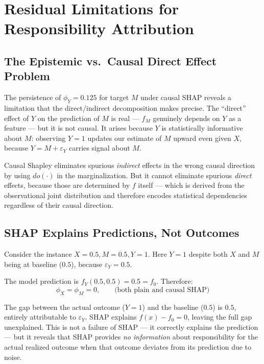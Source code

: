 \documentclass[12pt]{article}
\begin{document}
\section{Residual Limitations for Responsibility Attribution}

\subsection{The Epistemic vs.\ Causal Direct Effect Problem}

The persistence of $\phi_Y = 0.125$ for target $M$ under causal SHAP reveals a limitation
that the direct/indirect decomposition makes precise. The ``direct'' effect of $Y$ on the
prediction of $M$ is real --- $f_M$ genuinely depends on $Y$ as a feature --- but it is
not causal. It arises because $Y$ is statistically informative about $M$: observing $Y=1$
updates our estimate of $M$ upward even given $X$, because $Y = M + \varepsilon_Y$ carries
signal about $M$.

Causal Shapley eliminates spurious \emph{indirect} effects in the wrong causal direction
by using $do(\cdot)$ in the marginalization. But it cannot eliminate spurious \emph{direct}
effects, because those are determined by $f$ itself --- which is derived from the observational
joint distribution and therefore encodes statistical dependencies regardless of their
causal direction.

\subsection{SHAP Explains Predictions, Not Outcomes}

Consider the instance $X = 0.5, M = 0.5, Y = 1$. Here $Y = 1$ despite both $X$ and $M$
being at baseline ($0.5$), because $\varepsilon_Y = 0.5$.

The model prediction is $f_Y(0.5, 0.5) = 0.5 = f_0$. Therefore:
\begin{equation}
\phi_X = \phi_M = 0, \qquad \text{(both plain and causal SHAP)}
\end{equation}

The gap between the actual outcome ($Y=1$) and the baseline ($0.5$) is $0.5$, entirely
attributable to $\varepsilon_Y$. SHAP explains $f(x) - f_0 = 0$, leaving the full gap
unexplained. This is not a failure of SHAP --- it correctly explains the prediction ---
but it reveals that SHAP provides \emph{no information} about responsibility for the
actual realized outcome when that outcome deviates from its prediction due to noise.
\end{document}

